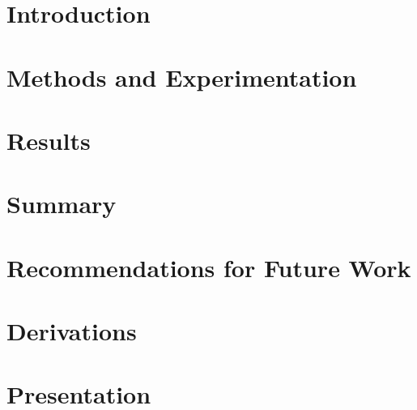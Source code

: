 \documentclass[12pt,american]{report}
\begin{document}
\renewcommand\thepage{}

\newpage
\mbox{}
\newpage

\renewcommand\thepage{\arabic{page}}
\setcounter{page}{2}

\doublespacing%



\singlespacing%
\tableofcontents             %
\listoffigures               %



\cleardoublepage%


\doublespacing%

\chapter{Introduction}

\chapter{Methods and Experimentation}



\chapter{Results}

\chapter{Summary}

\chapter{Recommendations for Future Work}


\appendix
\chapter{Derivations}

\chapter{Presentation}
\end{document}
